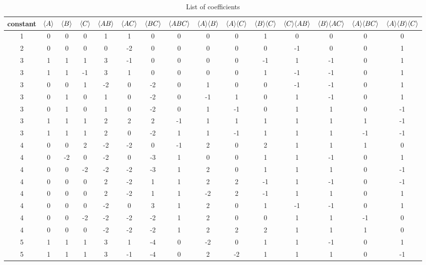 \begin{table}[ht]\centering\caption{List of coefficients}
\begin{tabularx}{\linewidth}{ccccccccccccccc} 
  constant & \(\langle A\rangle\) & \(\langle B\rangle\) & \(\langle C\rangle\) & \(\langle A B\rangle\) & \(\langle A C\rangle\) & \(\langle B C\rangle\) & \(\langle A B C\rangle\) & \(\langle A\rangle\langle B\rangle\) & \(\langle A\rangle\langle C\rangle\) & \(\langle B\rangle\langle C\rangle\) & \(\langle C\rangle\langle A B\rangle\) & \(\langle B\rangle\langle A C\rangle\) &
   {\(\langle A\rangle\langle B C\rangle\)} & {\(\langle A\rangle\langle B\rangle\langle C\rangle\)}   \\\bottomrule
 1 & 0 & 0 & 0 & 1 & 1 & 0 & 0 & 0 & 0 & 1 & 0 & 0 & 0 & 0 \\
 2 & 0 & 0 & 0 & 0 & -2 & 0 & 0 & 0 & 0 & 0 & -1 & 0 & 0 & 1 \\
 3 & 1 & 1 & 1 & 3 & -1 & 0 & 0 & 0 & 0 & -1 & 1 & -1 & 0 & 1 \\
 3 & 1 & 1 & -1 & 3 & 1 & 0 & 0 & 0 & 0 & 1 & -1 & -1 & 0 & 1 \\
 3 & 0 & 0 & 1 & -2 & 0 & -2 & 0 & 1 & 0 & 0 & -1 & -1 & 0 & 1 \\
 3 & 0 & 1 & 0 & 1 & 0 & -2 & 0 & -1 & 1 & 0 & 1 & -1 & 0 & 1 \\
 3 & 0 & 1 & 0 & 1 & 0 & -2 & 0 & 1 & -1 & 0 & 1 & 1 & 0 & -1 \\
 3 & 1 & 1 & 1 & 2 & 2 & 2 & -1 & 1 & 1 & 1 & 1 & 1 & 1 & -1 \\
 3 & 1 & 1 & 1 & 2 & 0 & -2 & 1 & 1 & -1 & 1 & 1 & 1 & -1 & -1 \\
 4 & 0 & 0 & 2 & -2 & -2 & 0 & -1 & 2 & 0 & 2 & 1 & 1 & 1 & 0 \\
 4 & 0 & -2 & 0 & -2 & 0 & -3 & 1 & 0 & 0 & 1 & 1 & -1 & 0 & 1 \\
 4 & 0 & 0 & -2 & -2 & -2 & -3 & 1 & 2 & 0 & 1 & 1 & 1 & 0 & -1 \\
 4 & 0 & 0 & 0 & 2 & -2 & 1 & 1 & 2 & 2 & -1 & 1 & -1 & 0 & -1 \\
 4 & 0 & 0 & 0 & 2 & -2 & 1 & 1 & -2 & 2 & -1 & 1 & 1 & 0 & 1 \\
 4 & 0 & 0 & 0 & -2 & 0 & 3 & 1 & 2 & 0 & 1 & -1 & -1 & 0 & 1 \\
 4 & 0 & 0 & -2 & -2 & -2 & -2 & 1 & 2 & 0 & 0 & 1 & 1 & -1 & 0 \\
 4 & 0 & 0 & 0 & -2 & -2 & -2 & 1 & 2 & 2 & 2 & 1 & 1 & 1 & 0 \\
 5 & 1 & 1 & 1 & 3 & 1 & -4 & 0 & -2 & 0 & 1 & 1 & -1 & 0 & 1 \\
 5 & 1 & 1 & 1 & 3 & -1 & -4 & 0 & 2 & -2 & 1 & 1 & 1 & 0 & -1 \\

\end{tabularx}
\end{table}
